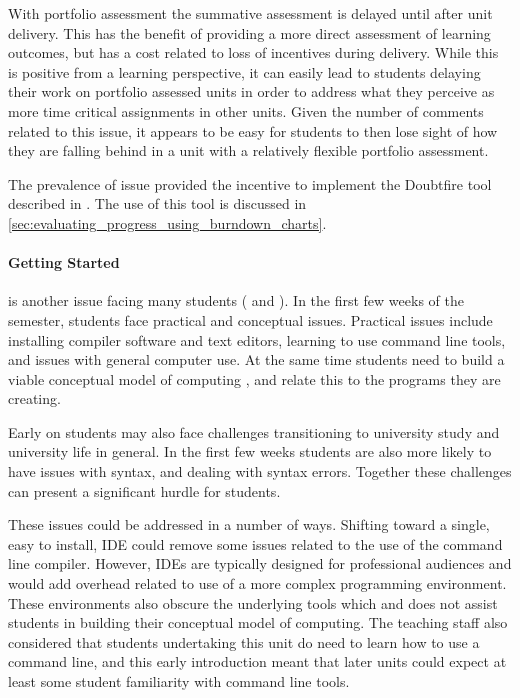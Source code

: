With portfolio assessment the summative assessment is delayed until after unit delivery. This has the benefit of providing a more direct assessment of learning outcomes, but has a cost related to loss of incentives during delivery. While this is positive from a learning perspective, it can easily lead to students delaying their work on portfolio assessed units in order to address what they perceive as more time critical assignments in other units. Given the number of comments related to this issue, it appears to be easy for students to then lose sight of how they are falling behind in a unit with a relatively flexible portfolio assessment.

The prevalence of issue provided the incentive to implement the Doubtfire tool described in . The use of this tool is discussed in \ref{sec:evaluating_progress_using_burndown_charts}.


\paragraph{Getting Started} %
\label{ssub:getting_started}

is another issue facing many students ( and ). In the first few weeks of the semester, students face practical and conceptual issues. Practical issues include installing compiler software and text editors, learning to use command line tools, and issues with general computer use. At the same time students need to build a viable conceptual model of computing \cite{Hoc:1990}, and relate this to the programs they are creating. 

Early on students may also face challenges transitioning to university study and university life in general. In the first few weeks students are also more likely to have issues with syntax, and dealing with syntax errors. Together these challenges can present a significant hurdle for students.

These issues could be addressed in a number of ways. Shifting toward a single, easy to install, IDE could remove some issues related to the use of the command line compiler. However, IDEs are typically designed for professional audiences and would add overhead related to use of a more complex programming environment. These environments also obscure the underlying tools which and does not assist students in building their conceptual model of computing. The teaching staff also considered that students undertaking this unit do need to learn how to use a command line, and this early introduction meant that later units could expect at least some student familiarity with command line tools.

